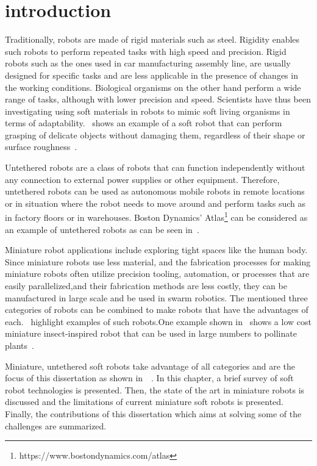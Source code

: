\graphicspath{{Images/intro/}}
\chapter{introduction}
\label{chap:intro}
Traditionally, robots are made of rigid materials such as steel. Rigidity enables such robots to perform repeated tasks with high speed and precision. Rigid robots such as the ones used in car manufacturing assembly line, are usually designed for specific tasks and are less applicable in the presence of changes in the working conditions. Biological organisms on the other hand perform a wide range of tasks, although with lower precision and speed. Scientists have thus been investigating using soft materials in robots to mimic soft living organisms in terms of adaptability.~ shows an example of a soft robot that can perform grasping of delicate objects without damaging them, regardless of their shape or surface roughness~\cite{Li2019}.

Untethered robots are a class of robots that can function independently without any connection to external power supplies or other equipment. Therefore, untethered robots can be used as autonomous mobile robots in remote locations or in situation where the robot needs to move around and perform tasks such as in factory floors or in warehouses. Boston Dynamics' Atlas\footnote{https://www.bostondynamics.com/atlas\label{fn:boston}} can be considered as an example of untethered robots as can be seen in~. 

Miniature robot applications include exploring tight spaces like the human body. Since miniature robots use less material, and the fabrication processes for making miniature robots often utilize precision tooling, automation, or processes that are easily parallelized,and their fabrication methods are less costly, they can be manufactured in large scale and be used in swarm robotics. The mentioned three categories of robots can be combined to make robots that have the advantages of each.~ highlight examples of such robots.One example shown in~ shows a low cost miniature insect-inspired robot that can be used in large numbers to pollinate plants~\cite{Jafferis2019}. 

Miniature, untethered soft robots take advantage of all categories and are the focus of this dissertation as shown in~~\cite{Khodambashi2021untethered}. In this chapter, a brief survey of soft robot technologies is presented. Then, the state of the art in miniature robots is discussed and the limitations of current miniature soft robots is presented. Finally, the contributions of this dissertation which aims at solving some of the challenges are summarized.
 
